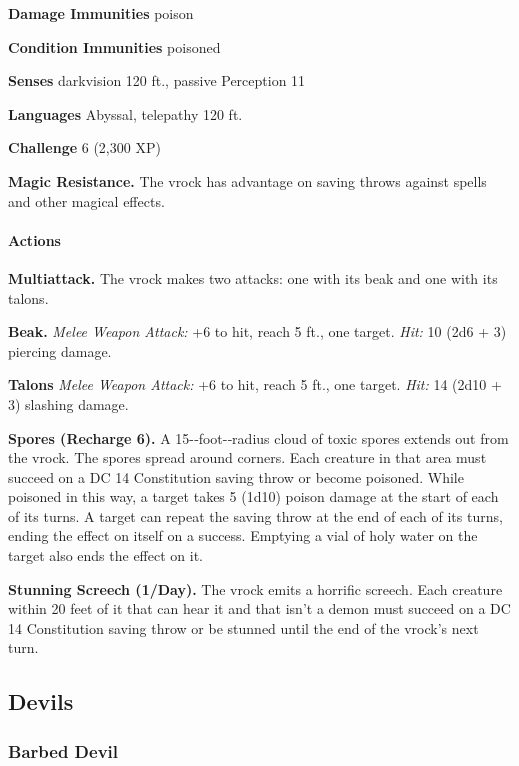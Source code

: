 \documentclass[
]{article}
\begin{document}
\textbf{Damage Immunities} poison

\textbf{Condition Immunities} poisoned

\textbf{Senses} darkvision 120 ft., passive Perception 11

\textbf{Languages} Abyssal, telepathy 120 ft.

\textbf{Challenge} 6 (2,300 XP)

\textbf{Magic Resistance.} The vrock has advantage on saving throws
against spells and other magical effects.

\hypertarget{actions-8}{%
\paragraph{Actions}\label{actions-8}}

\textbf{Multiattack.} The vrock makes two attacks: one with its beak and
one with its talons.

\textbf{Beak.} \emph{Melee Weapon Attack:} +6 to hit, reach 5 ft., one
target. \emph{Hit:} 10 (2d6 + 3) piercing damage.

\textbf{Talons} \emph{Melee Weapon Attack:} +6 to hit, reach 5 ft., one
target. \emph{Hit:} 14 (2d10 + 3) slashing damage.

\textbf{Spores (Recharge 6).} A 15-­‐foot-­‐radius cloud of toxic spores
extends out from the vrock. The spores spread around corners. Each
creature in that area must succeed on a DC 14 Constitution saving throw
or become poisoned. While poisoned in this way, a target takes 5 (1d10)
poison damage at the start of each of its turns. A target can repeat the
saving throw at the end of each of its turns, ending the effect on
itself on a success. Emptying a vial of holy water on the target also
ends the effect on it.

\textbf{Stunning Screech (1/Day).} The vrock emits a horrific screech.
Each creature within 20 feet of it that can hear it and that isn't a
demon must succeed on a DC 14 Constitution saving throw or be stunned
until the end of the vrock's next turn.

\hypertarget{devils}{%
\subsection{Devils}\label{devils}}

\hypertarget{barbed-devil}{%
\subsubsection{Barbed Devil}\label{barbed-devil}}
\end{document}
